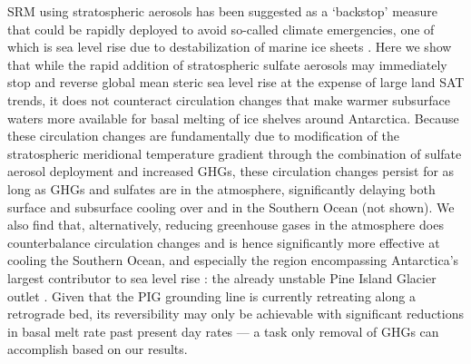 \documentclass{nature}
\begin{document}
SRM using stratospheric aerosols has been suggested as a `backstop' measure that could be rapidly deployed to avoid so-called climate emergencies, one of which is sea level rise due to destabilization of marine ice sheets \cite{blackstock09}. Here we show that while the rapid addition of stratospheric sulfate aerosols may immediately stop and reverse global mean steric sea level rise at the expense of large land SAT trends, it does not counteract circulation changes that make warmer subsurface waters more available for basal melting of ice shelves around Antarctica. Because these circulation changes are fundamentally due to modification of the stratospheric meridional temperature gradient through the combination of sulfate aerosol deployment and increased GHGs, these circulation changes persist for as long as GHGs and sulfates are in the atmosphere, significantly delaying both surface and subsurface cooling over and in the Southern Ocean (not shown). We also find that, alternatively, reducing greenhouse gases in the atmosphere does counterbalance circulation changes and is hence significantly more effective at cooling the Southern Ocean, and especially the region encompassing Antarctica's largest contributor to sea level rise \cite{shepherd12}: the already unstable Pine Island Glacier outlet \cite{rignot14}. Given that the PIG grounding line is currently retreating along a retrograde bed, its reversibility may only be achievable with significant reductions in basal melt rate past present day rates \cite{favier14} --- a task only removal of GHGs can accomplish based on our results.

\end{document}
